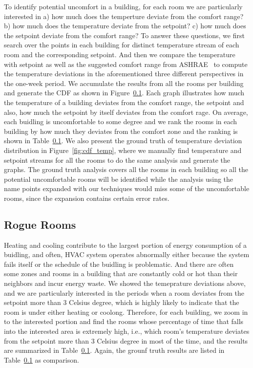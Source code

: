 To identify potential uncomfort in a building, for each room we are particularly interested in a) how much does the temperture deviate from the comfort range? b) how much does the temperature deviate from the setpoint? c) how much does the setpoint deviate from the comfort range? To answer these questions, we first search over the points in each building for distinct temperature stream of each room and the corresponding setpoint. And then we compare the temperature with setpoint as well as the suggested comfort range from ASHRAE~\cite{} to compute the temperature deviations in the aforementioned three different perspectives in the one-week period. We accumulate the results from all the rooms per building and generate the CDF as shown in Figure~\ref{}. Each graph illustrates how much the temperature of a building deviates from the comfort range, the setpoint and also, how much the setpoint by itself deviates from the comfort rage. On average, each buidling is uncomfortable to some degree and we rank the rooms in each building by how much they deviates from the comfort zone and the ranking is shown in Table~\ref{}. We also present the ground truth of temperature deviation distribution in Figure~\ref{fig:cdf_temp}, where we manually find temperature and setpoint streams for all the rooms to do the same analysis and generate the graphs. The ground truth analysis covers all the rooms in each building so all the potential uncomfortable rooms will be identified while the analysis using the name points expanded with our techniques would miss some of the uncomfortable rooms, since the expansion contains certain error rates.

\subsection{Rogue Rooms}
Heating and cooling contribute to the largest portion of energy consumption of a buidling, and often, HVAC system operates abnormally either because the system fails itself or the schedule of the buidling is problematic. And there are often some zones and rooms in a building that are constantly cold or hot than their neighbors and incur energy waste. We showed the temeprature deviations above, and we are particularly interested in the periods when a room deviates from the setpoint more than 3 Celsius degree, which is highly likely to indicate that the room is under either heating or coolong. Therefore, for each building, we zoom in to the interested portion and find the rooms whose percentage of time that falls into the interested area is extremely high, i.e., which room's temperature deviates from the setpoint more than 3 Celsius degree in most of the time, and the results are summarized in Table~\ref{}. Again, the grounf truth results are listed in Table~\ref{} as comparison.

